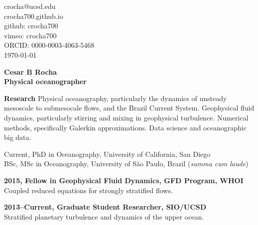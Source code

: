 \documentclass[a4paper,11pt,final]{memoir}
\newcommand{\Sep}{\vspace{1.25em}}
\newcommand{\SmallSep}{\vspace{0.5em}}
\newenvironment{Research}
    {\ignorespaces\textbf{\color{NavyBlue} Research}}
\newcommand{\CVSection}[1]
    {\Large\textbf{#1}\par
    \SmallSep\normalsize\normalfont}
\newcommand{\CVItem}[1]
    {\textbf{\color{NavyBlue} #1}}
\begin{document}
%

\begin{flushright}\small
    crocha@ucsd.edu\\[.1cm]
    crocha700.github.io\\[.1cm]
    github: crocha700\\[.1cm]
    vimeo: crocha700\\[.1cm]
    ORCID: 0000-0003-4063-5468\\[.1cm] 
    \textcolor[gray]{0.45}{\mydate\today}\\[.1cm]
\end{flushright}\normalsize
\framebreak

\Huge\bfseries { \color{NavyBlue}  Cesar B Rocha} \\
\Large\bfseries Physical oceanographer \\

\normalsize\normalfont

\begin{Research}
Physical oceanography, particularly the dynamics of unsteady
mesoscale to submesocale flows, and the Brazil Current System. 
Geophysical fluid dynamics, particularly stirring and mixing in geophysical turbulence.  
Numerical methods, specifically Galerkin approximations.
Data science and oceanographic big data.
\end{Research}

\Sep


Current, PhD in Oceanography, University of California, San Diego \\
BSc, MSc in Oceanography, University of S\~ao Paulo, Brazil (\textit{summa cum laude}) \\

\Sep


\CVItem{2015, Fellow in Geophysical Fluid Dynamics, GFD Program, WHOI}\\
Coupled reduced equations for strongly stratified flows.
\SmallSep

\CVItem{2013--Current, Graduate Student Researcher, SIO/UCSD}\\
Stratified planetary turbulence and dynamics of the upper ocean.
\SmallSep
\end{document}
